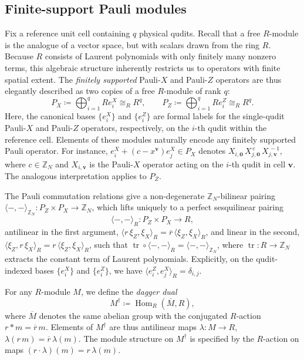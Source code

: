 \documentclass[aps,prx,english,superscriptaddress,twocolumn,tightenlines,showpacs,longbibliography,floatfix,amsfonts]{revtex4-2}
\theoremstyle{remark}
\theoremstyle{definition}
\begin{document}
\subsection{Finite-support Pauli modules}
\label{subsec:Pauli}
Fix a reference unit cell containing $ q $ physical qudits. Recall that a free $R$-module is the analogue of a vector space, but with scalars drawn from the ring $R$. Because $R$ consists of Laurent polynomials with only finitely many nonzero terms, this algebraic structure inherently restricts us to operators with finite spatial extent. The  \textit{finitely supported} Pauli-$X$ and Pauli-$Z$ operators are thus elegantly described as two copies of a free $R$-module of rank $q$:
\begin{equation}
	P_X
	\coloneqq
	\bigoplus_{i=1}^q R e_i^X
	\cong_R R^q,
	\qquad
	P_Z
	\coloneqq
	\bigoplus_{i=1}^q R e_i^Z
	\cong_R R^q.
\end{equation}
Here, the canonical bases $\{e_i^X\}$ and $\{e_i^Z\}$ are formal labels for the single-qudit Pauli-$X$ and Pauli-$Z$ operators, respectively, on the $i$-th qudit within the reference cell. Elements of these modules naturally encode any finitely supported Pauli operator. For instance, $e_i^X + (c - x^{\mathbf v}) e_j^X\in P_X$ denotes $X_{i,\mathbf 0}\, X_{j,\mathbf 0}^{\,c}\, X_{j,\mathbf v}^{\,-1}$, where $c \in \mathbb{Z}_N$ and $X_{i,\mathbf v}$ is the Pauli-$X$ operator acting on the $i$-th qudit in cell $\mathbf v$. The analogous interpretation applies to $P_Z$.


The Pauli commutation relations give a non-degenerate $\mathbb{Z}_N$-bilinear pairing $\langle -, - \rangle_{\mathbb{Z}_N} \colon P_Z \times P_X \to \mathbb{Z}_N$, which lifts uniquely to a perfect sesquilinear pairing
\begin{equation}
	\langle -, - \rangle_R \colon P_Z \times P_X \longrightarrow R,
\end{equation}
antilinear in the first argument, $\langle r \,\xi_Z, \xi_X \rangle_R = \overline{r}\,\langle \xi_Z, \xi_X \rangle_R$, and linear in the second, $\langle \xi_Z, r\, \xi_X \rangle_R = r\,\langle \xi_Z, \xi_X \rangle_R$, such that $\operatorname{tr} \circ \langle -, - \rangle_R = \langle -, - \rangle_{\mathbb{Z}_N}$, where $\operatorname{tr}\colon R\to\mathbb{Z}_N$ extracts the constant term of Laurent polynomials. Explicitly, on the qudit-indexed bases $\{e_i^X\}$ and $\{e_i^Z\}$, we have $\langle e_i^Z, e_j^X \rangle_R = \delta_{i,j}$.

For any $R$-module $M$, we define the \emph{dagger dual}
\begin{equation}
	M^\dagger \coloneqq \operatorname{Hom}_R(\overline{M}, R),
\end{equation}
where $\overline{M}$ denotes the same abelian group with the conjugated
$R$-action $r \ast m = \overline{r}\, m$. Elements of $M^\dagger$ are thus
antilinear maps $\lambda: M \to R$, $\lambda(r\, m) = \overline{r}\, \lambda(m)$. The module structure on $M^\dagger$ is specified by the $R$-action on maps $(r \cdot \lambda)(m) = r\, \lambda(m)$.
\end{document}
